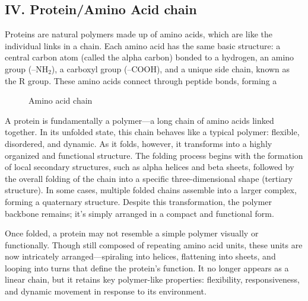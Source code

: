 \documentclass[12pt]{article}
\begin{document}
\begin{flushleft}
\vspace{-2em} 
\subsection*{IV. Protein/Amino Acid chain}
Proteins are natural polymers made up of amino acids, which are like the individual links in a chain. Each amino acid has the same basic structure: a central carbon atom (called the alpha carbon) bonded to a hydrogen, an amino group (–NH$_2$), a carboxyl group (–COOH), and a unique side chain, known as the R group. These amino acids connect through peptide bonds, forming a 

\begin{figure}[!ht]
  \centering
  
  \caption{Amino acid chain}
\end{figure}

A protein is fundamentally a polymer—a long chain of amino acids linked together. In its unfolded state, this chain behaves like a typical polymer: flexible, disordered, and dynamic. As it folds, however, it transforms into a highly organized and functional structure. The folding process begins with the formation of local secondary structures, such as alpha helices and beta sheets, followed by the overall folding of the chain into a specific three-dimensional shape (tertiary structure). In some cases, multiple folded chains assemble into a larger complex, forming a quaternary structure. Despite this transformation, the polymer backbone remains; it’s simply arranged in a compact and functional form.

Once folded, a protein may not resemble a simple polymer visually or functionally. Though still composed of repeating amino acid units, these units are now intricately arranged—spiraling into helices, flattening into sheets, and looping into turns that define the protein's function. It no longer appears as a linear chain, but it retains key polymer-like properties: flexibility, responsiveness, and dynamic movement in response to its environment.


\end{flushleft}
\end{document}
